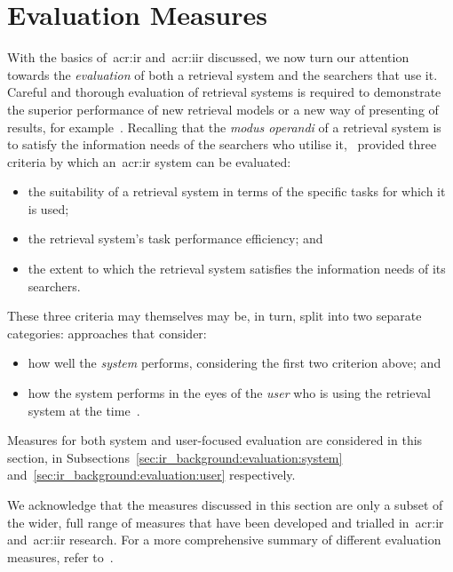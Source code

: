 \section{Evaluation Measures}\label{sec:ir_background:evaluation}
With the basics of~\gls{acr:ir} and~\gls{acr:iir} discussed, we now turn our attention towards the \emph{evaluation} of both a retrieval system and the searchers that use it. Careful and thorough evaluation of retrieval systems is required to demonstrate the superior performance of new retrieval models or a new way of presenting of results, for example~\citep{manning2008ir}. Recalling that the \emph{modus operandi} of a retrieval system is to satisfy the information needs of the searchers who utilise it,~\cite{lancaster1968information} provided three criteria by which an~\gls{acr:ir} system can be evaluated:

\begin{itemize}
    \item{the suitability of a retrieval system in terms of the specific tasks for which it is used;}
    \item{the retrieval system's task performance efficiency; and}
    \item{the extent to which the retrieval system satisfies the information needs of its searchers.}
\end{itemize}

These three criteria may themselves may be, in turn, split into two separate categories: approaches that consider:

\begin{itemize}
    \item{how well the \emph{system} performs, considering the first two criterion above; and}
    \item{how the system performs in the eyes of the \emph{user} who is using the retrieval system at the time~\citep{voorhees2005trec_book}.}
\end{itemize}

Measures for both system and user-focused evaluation are considered in this section, in Subsections~\ref{sec:ir_background:evaluation:system} and~\ref{sec:ir_background:evaluation:user} respectively.

We acknowledge that the measures discussed in this section are only a subset of the wider, full range of measures that have been developed and trialled in~\gls{acr:ir} and~\gls{acr:iir} research. For a more comprehensive summary of different evaluation measures, refer to~\cite{sanderson2010test}.

